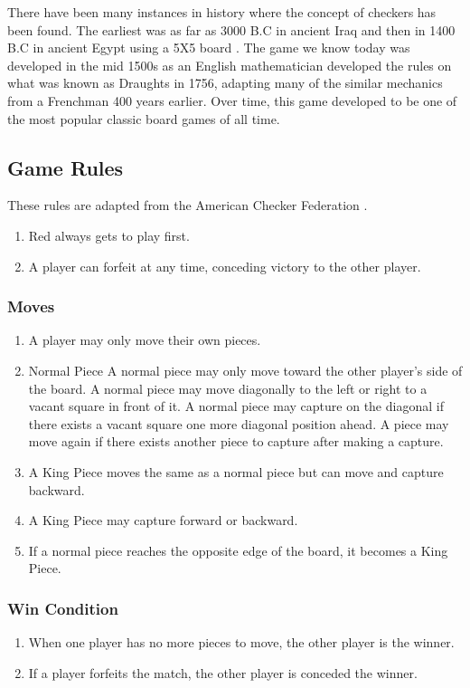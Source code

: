 \documentclass{scrreprt}
\begin{document}
There have been many instances in history where the concept of checkers has been found. The earliest was as far as 3000 B.C
in ancient Iraq and then in 1400 B.C in ancient Egypt using a 5X5 board \cite{historyCheckers}. 
The game we know today was developed in the mid 1500s as an English mathematician developed the rules on what was known as Draughts in 1756, adapting many of the similar mechanics from a Frenchman 400 years earlier. Over time, this game developed to be one of the most popular classic board games of all time.

\subsection{Game Rules}
	These rules are adapted from the American Checker Federation \cite {checkersFoundation}.
	\begin{enumerate}
	\item Red always gets to play first.
	\item A player can forfeit at any time, conceding victory to the other player.
	\end{enumerate}
\subsubsection{Moves} 
\begin{enumerate}
    \item A player may only move their own pieces.
    \item Normal Piece
        \subitem A normal piece may only move toward the other player's side of the board.
        \subitem A normal piece may move diagonally to the left or right to a vacant square in front of it.
        \subitem A normal piece may capture on the diagonal if there exists a vacant square one more diagonal position ahead.
            \subsubitem A piece may move again if there exists another piece to capture after making a capture.
    \item A King Piece moves the same as a normal piece but can move and capture backward.
    \item A King Piece may capture forward or backward.
    \item If a normal piece reaches the opposite edge of the board, it becomes a King Piece.
\end{enumerate}

\subsubsection{Win Condition}
\begin{enumerate}
    \item When one player has no more pieces to move, the other player is the winner.
    \item If a player forfeits the match, the other player is conceded the winner.
\end{enumerate}
\end{document}

